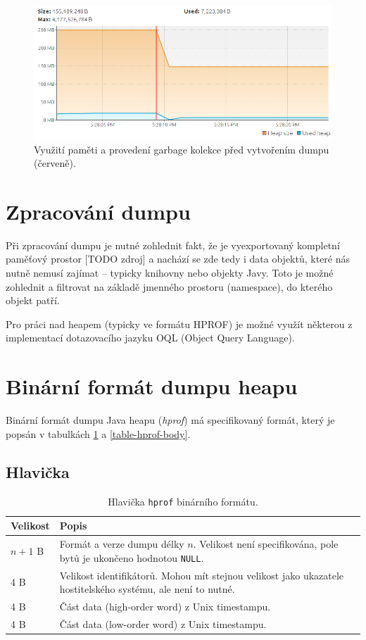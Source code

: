 \begin{figure}[h]
	\centering
	\includegraphics[scale=0.5]{obrazky/heapdump-performed.png}
	\caption{Využití paměti a provedení garbage kolekce před vytvořením dumpu (červeně).}
	\label{obr1}
\end{figure}

\section{Zpracování dumpu}
Při zpracování dumpu je nutné zohlednit fakt, že je vyexportovaný kompletní paměťový prostor [TODO zdroj] a nachází se zde tedy i data objektů, které nás nutně nemusí zajímat – typicky knihovny nebo objekty Javy. Toto je možné zohlednit a filtrovat na základě jmenného prostoru (namespace), do kterého objekt patří.

Pro práci nad heapem  (typicky ve formátu HPROF) je možné využít některou z implementací dotazovacího jazyku OQL (Object Query Language).

\section{Binární formát dumpu heapu}
Binární formát dumpu Java heapu (\textit{hprof}) má specifikovaný formát, který je popsán v tabulkách \ref{table-hprof-header} a \ref{table-hprof-body}.

\subsection{Hlavička}
\begin{table}[ht!]
    \begin{tabularx}{\textwidth}{|l|X|}
        \hline
    \textbf{Velikost} & \textbf{Popis} \\ \hline \hline
    $n + 1$ B & Formát a verze dumpu délky $n$. Velikost není specifikována, pole bytů je ukončeno hodnotou \texttt{NULL}. \\
    4 B & Velikost identifikátorů. Mohou mít stejnou velikost jako ukazatele hostitelského systému, ale není to nutné. \\
    4 B & Část data (high-order word) z Unix timestampu. \\
    4 B & Část data (low-order word) z Unix timestampu.  \\ \hline                                                                   
    \end{tabularx}
    \caption{Hlavička \texttt{hprof} binárního formátu.}
    \label{table-hprof-header}
\end{table}

